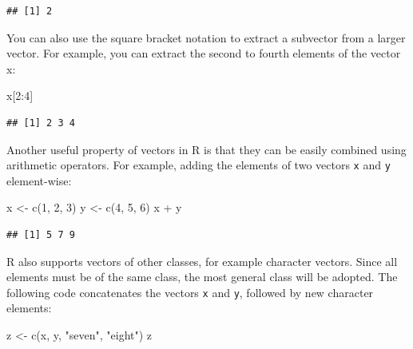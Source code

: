 \documentclass[
]{book}
\newenvironment{Shaded}{\begin{snugshade}}{\end{snugshade}}
\newcommand{\DecValTok}[1]{\textcolor[rgb]{0.00,0.00,0.81}{#1}}
\newcommand{\FunctionTok}[1]{\textcolor[rgb]{0.00,0.00,0.00}{#1}}
\newcommand{\NormalTok}[1]{#1}
\newcommand{\OtherTok}[1]{\textcolor[rgb]{0.56,0.35,0.01}{#1}}
\newcommand{\SpecialCharTok}[1]{\textcolor[rgb]{0.00,0.00,0.00}{#1}}
\newcommand{\StringTok}[1]{\textcolor[rgb]{0.31,0.60,0.02}{#1}}
\begin{document}
\begin{verbatim}
## [1] 2
\end{verbatim}

You can also use the square bracket notation to extract a subvector from a larger vector. For example, you can extract the second to fourth elements of the vector x:

\begin{Shaded}
\begin{Highlighting}[]
\NormalTok{x[}\DecValTok{2}\SpecialCharTok{:}\DecValTok{4}\NormalTok{]}
\end{Highlighting}
\end{Shaded}

\begin{verbatim}
## [1] 2 3 4
\end{verbatim}

Another useful property of vectors in R is that they can be easily combined using arithmetic operators. For example, adding the elements of two vectors \texttt{x} and \texttt{y} element-wise:

\begin{Shaded}
\begin{Highlighting}[]
\NormalTok{x }\OtherTok{\textless{}{-}} \FunctionTok{c}\NormalTok{(}\DecValTok{1}\NormalTok{, }\DecValTok{2}\NormalTok{, }\DecValTok{3}\NormalTok{)}
\NormalTok{y }\OtherTok{\textless{}{-}} \FunctionTok{c}\NormalTok{(}\DecValTok{4}\NormalTok{, }\DecValTok{5}\NormalTok{, }\DecValTok{6}\NormalTok{)}
\NormalTok{x }\SpecialCharTok{+}\NormalTok{ y}
\end{Highlighting}
\end{Shaded}

\begin{verbatim}
## [1] 5 7 9
\end{verbatim}

R also supports vectors of other classes, for example character vectors. Since all elements must be of the same class, the most general class will be adopted. The following code concatenates the vectors \texttt{x} and \texttt{y}, followed by new character elements:

\begin{Shaded}
\begin{Highlighting}[]
\NormalTok{z }\OtherTok{\textless{}{-}} \FunctionTok{c}\NormalTok{(x, y, }\StringTok{"seven"}\NormalTok{, }\StringTok{"eight"}\NormalTok{)}
\NormalTok{z}
\end{Highlighting}
\end{Shaded}
\end{document}
